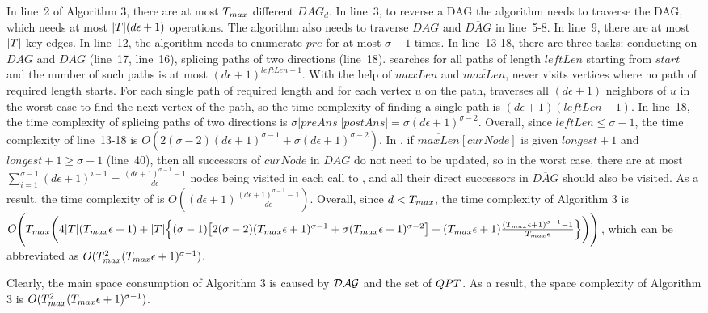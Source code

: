 \documentclass[conference]{IEEEtran}
\newcommand{\mineapsoracle}{Algorithm 3\xspace}
\begin{document}
	 In line~2 of \mineapsoracle, there are at most $ T_{max} $ different $ DAG_d $. In line~3, to reverse a DAG the algorithm needs to traverse the DAG, which needs at most $ |T|(d\epsilon+1) $ operations. The algorithm also needs to traverse $ DAG $ and $ \overline{DAG} $ in line~5-8. In line~9, there are at most $ |T| $ key edges. In line~12, the algorithm needs to enumerate $ pre $ for at most $ \sigma-1 $ times. In line~13-18, there are three tasks: conducting  on $ DAG $ and $ \overline{DAG} $ (line~17, line~16), splicing paths of two directions (line~18).  searches for all paths of length $ leftLen $ starting from $ start $ and the number of such paths is at most $ (d\epsilon+1)^{leftLen-1} $. With the help of $ maxLen $ and $ \overline{maxLen} $,  never visits vertices where no path of required length starts. For each single path of required length and for each vertex $ u $ on the path,  traverses all $ (d\epsilon+1) $ neighbors of $ u $ in the worst case to find the next vertex of the path, so the time complexity of finding a single path is $ (d\epsilon+1)(leftLen-1) $. In line~18, the time complexity of splicing paths of two directions is $ \sigma|preAns||postAns|=\sigma(d\epsilon+1)^{\sigma-2} $. Overall, since $ leftLen\leq \sigma-1 $, the time complexity of line~13-18 is $ O(2(\sigma-2)(d\epsilon+1)^{\sigma-1}+\sigma(d\epsilon+1)^{\sigma-2}) $. In , if $\overline{maxLen}[curNode]$ is given $ longest+1 $ and $ longest+1\geq \sigma-1 $ (line~40), then all successors of $ curNode $ in $ DAG $ do not need to be updated, so in the worst case, there are at most $ \sum_{i=1}^{\sigma-1}(d\epsilon+1)^{i-1}=\frac{(d\epsilon+1)^{\sigma-1}-1}{d\epsilon} $ nodes being visited in each call to , and all their direct successors in $\overline{DAG}$ should also be visited. As a result, the time complexity of  is $ O((d\epsilon+1)\frac{(d\epsilon+1)^{\sigma-1}-1}{d\epsilon}) $. Overall, since $ d<T_{max} $, the time complexity of \mineapsoracle is $O\Bigg(T_{max}\bigg(4|T|(T_{max}\epsilon+1)+|T|\Big\{(\sigma-1)\big[2(\sigma-2)(T_{max}\epsilon+1)^{\sigma-1}+\sigma(T_{max}\epsilon+1)^{\sigma-2}\big]+(T_{max}\epsilon+1)\frac{(T_{max}\epsilon+1)^{\sigma-1}-1}{T_{max}\epsilon}\Big\}\bigg)\Bigg)$, which can be abbreviated as $ O(T_{max}^2(T_{max}\epsilon+1)^{\sigma-1}) $.
	
	Clearly, the main space consumption of \mineapsoracle is caused by $ \mathcal{DAG} $ and the set of \qptss $ QPT $. As a result, the space complexity of \mineapsoracle is $ O(T_{max}^2(T_{max}\epsilon+1)^{\sigma-1}) $.
	
\end{document}
